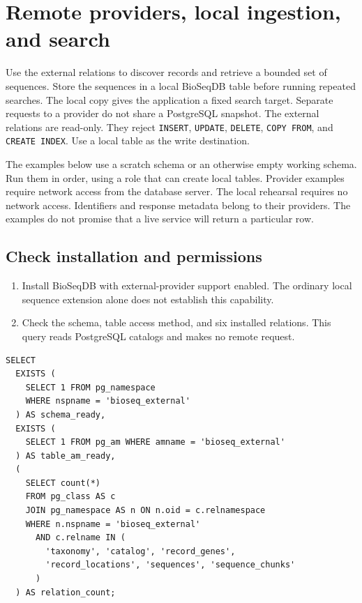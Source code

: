 \section{Remote providers, local ingestion, and search}
\label{sec:appendix-remote-ingestion}
\label{sec:app-remote-ingestion}

Use the external relations to discover records and retrieve a bounded set of
sequences. Store the sequences in a local BioSeqDB table before running repeated
searches. The local copy gives the application a fixed search target. Separate
requests to a provider do not share a PostgreSQL snapshot.
The external relations are read-only. They reject \texttt{INSERT},
\texttt{UPDATE}, \texttt{DELETE}, \texttt{COPY FROM}, and
\texttt{CREATE INDEX}. Use a local table as the write destination.

The examples below use a scratch schema or an otherwise empty working schema.
Run them in order, using a role that can create local tables. Provider examples
require network access from the database server. The local rehearsal requires
no network access. Identifiers and response metadata belong to their providers.
The examples do not promise that a live service will return a particular row.

\subsection{Check installation and permissions}
\label{app-remote-permissions}

\begin{enumerate}
  \item Install BioSeqDB with external-provider support enabled. The ordinary
        local sequence extension alone does not establish this capability.
  \item Check the schema, table access method, and six installed relations.
        This query reads PostgreSQL catalogs and makes no remote request.
\end{enumerate}

\par\noindent\begin{minipage}{\linewidth}
\begin{lstlisting}[style=bioseq-appendix-sql]
SELECT
  EXISTS (
    SELECT 1 FROM pg_namespace
    WHERE nspname = 'bioseq_external'
  ) AS schema_ready,
  EXISTS (
    SELECT 1 FROM pg_am WHERE amname = 'bioseq_external'
  ) AS table_am_ready,
  (
    SELECT count(*)
    FROM pg_class AS c
    JOIN pg_namespace AS n ON n.oid = c.relnamespace
    WHERE n.nspname = 'bioseq_external'
      AND c.relname IN (
        'taxonomy', 'catalog', 'record_genes',
        'record_locations', 'sequences', 'sequence_chunks'
      )
  ) AS relation_count;
\end{lstlisting}
\end{minipage}

